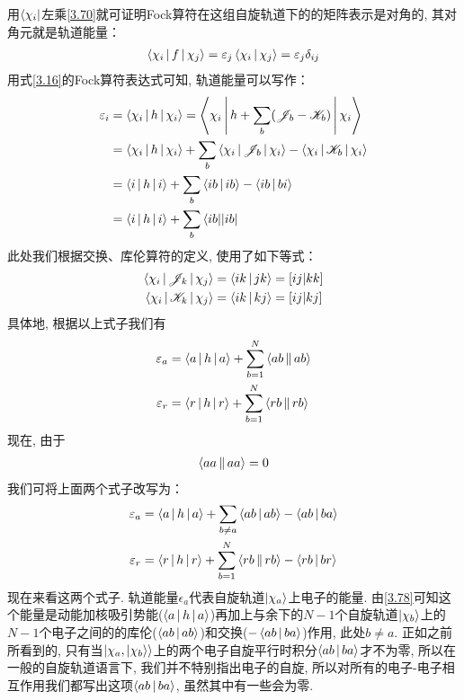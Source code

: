 用$\Bra{\chi_i}$左乘\eqref{3.70}就可证明Fock算符在这组自旋轨道下的的矩阵表示是对角的, 其对角元就是轨道能量：
\begin{align}
\Braket{\chi_i|f|\chi_j} = \varepsilon_j\Braket{\chi_i|\chi_j} = \varepsilon_j\delta_{ij}
\end{align}
用式\eqref{3.16}的Fock算符表达式可知, 轨道能量可以写作：
\begin{align}
\varepsilon_i & = \Braket{\chi_i|h|\chi_i} = \Braket{\chi_i|h+\sum_b(\mathscr{J}_b-\mathscr{K}_b)|\chi_i}\notag\\
           & = \Braket{\chi_i|h|\chi_i} + \sum_b\Braket{\chi_i|\mathscr{J}_b|\chi_i} - \Braket{\chi_i|\mathscr{K}_b|\chi_i}\notag\\
           & = \Braket{i|h|i} + \sum_b\Braket{ib|ib} - \Braket{ib|bi}\notag\\
           & = \Braket{i|h|i} + \sum_b\Bra{ib||ib}
\label{3.72}
\end{align}
此处我们根据交换、库伦算符的定义, 使用了如下等式：
\begin{align}
\Braket{\chi_i|\mathscr{J}_k|\chi_j} & = \Braket{ik|jk} = [ij|kk]\\
\Braket{\chi_i|\mathscr{K}_k|\chi_j} & = \Braket{ik|kj} = [ij|kj]
\end{align}
具体地, 根据以上式子我们有
\begin{align}
\label{3.75}
\varepsilon_a & = \Braket{a|h|a} + \sum_{b=1}^{N}\Braket{ab||ab}\\
\varepsilon_r & = \Braket{r|h|r} + \sum_{b=1}^{N}\Braket{rb||rb}
\label{3.76}
\end{align}
现在, 由于
\begin{align}
\Braket{aa||aa} = 0
\end{align}
我们可将上面两个式子改写为：
\begin{align}
\label{3.78}
\varepsilon_a & = \Braket{a|h|a} + \sum_{b\neq a}\Braket{ab|ab} - \Braket{ab|ba}\\
\varepsilon_r & = \Braket{r|h|r} + \sum_{b=1}^{N}\Braket{rb||rb} -\Braket{rb|br}
\label{3.79}
\end{align}
现在来看这两个式子. 轨道能量$\epsilon_a$代表自旋轨道$\Ket{\chi_a}$上电子的能量. 由\eqref{3.78}可知这个能量是动能加核吸引势能($\Braket{a|h|a}$)再加上与余下的$N-1$个自旋轨道$\Ket{\chi_b}$上的$N-1$个电子之间的的库伦($\Braket{ab|ab}$)和交换($-\Braket{ab|ba}$)作用, 此处$b \neq a$. 正如之前所看到的, 只有当$\Ket{\chi_a,\Ket{\chi_b}}$上的两个电子自旋平行时积分$\Braket{ab|ba}$才不为零, 所以在一般的自旋轨道语言下, 我们并不特别指出电子的自旋, 所以对所有的电子-电子相互作用我们都写出这项$\Braket{ab|ba}$, 虽然其中有一些会为零.

